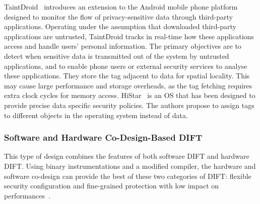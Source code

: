 TaintDroid~\cite{EGHTCCJMS-14-tocs} introduces an extension to the Android mobile phone platform designed to monitor the flow of privacy-sensitive data through third-party applications. Operating under the assumption that downloaded third-party applications are untrusted, TaintDroid tracks in real-time how these applications access and handle users’ personal information. The primary objectives are to detect when sensitive data is transmitted out of the system by untrusted applications, and to enable phone users or external security services to analyse these applications. They store the tag adjacent to data for spatial locality. This may cause large performance and storage overheads, as the tag fetching requires extra clock cycles for memory access.
HiStar~\cite{ZBKM-11-commacm} is an OS that has been designed to provide precise data specific security policies. The authors propose to assign tags to different objects in the operating system instead of data.


\subsubsection{Software and Hardware Co-Design-Based DIFT}
This type of design combines the features of both software DIFT and hardware DIFT. Using binary instrumentations and a modified compiler, the hardware and software co-design can provide the best of these two categories of DIFT: flexible security configuration and fine-grained protection with low impact on performances~\cite{CGDJ-21-micromac, BSMCVEJCO-21-acmcsur}.


